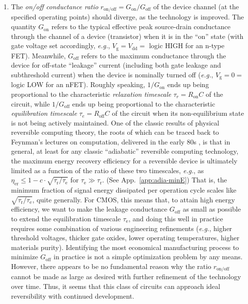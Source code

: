 \documentclass[preprints,article,accept,moreauthors,pdftex]{Definitions/mdpi}
\begin{document}
\begin{paracol}{2}
\begin{enumerate}
    \item The \emph{on/off conductance ratio} $r_{\mathrm{on/off}} = G_{\mathrm{on}}/G_{\mathrm{off}}$ of the device channel (at the specified operating points) should diverge, as the technology is improved. The quantity $G_{\mathrm{on}}$ refers to the typical effective peak source-drain conductance through the channel of a device (transistor) when it is in the ``on'' state (with gate voltage set accordingly, \emph{e.g.}, $V_\mathrm{g} = V_\mathrm{dd} = $ logic HIGH for an n-type FET). Meanwhile, $G_{\mathrm{off}}$ refers to the maximum conductance through the device for off-state ``leakage'' current (including both gate leakage and subthreshold current) when the device is nominally turned off (\emph{e.g.}, $V_\mathrm{g} = 0 = $ logic LOW for an nFET). Roughly speaking, $1/G_\mathrm{on}$ ends up being proportional to the characteristic \emph{relaxation timescale} $\tau_{r} = R_\mathrm{on}C$ of the circuit, while $1/G_\mathrm{off}$ ends up being proportional to the characteristic \emph{equilibration timescale} $\tau_e = R_\mathrm{off}C$ of the circuit when its non-equilibrium state is not being actively maintained. One of the classic results of physical reversible computing theory, the roots of which can be traced back to Feynman's lectures on computation, delivered in the early 80s \cite{Fey00}, is that in general, at least for any classic ``adiabatic'' reversible computing technology, the maximum energy recovery efficiency for a reversible device is ultimately limited as a function of the ratio of these two timescales, \emph{e.g.}, as $\eta_\mathrm{er} \leq 1 - c\cdot\sqrt{\tau_\mathrm{r}/\tau_\mathrm{e}}$ for $\tau_\mathrm{e} \gg \tau_\mathrm{r}$. (See App.~\ref{app:adia-minE}) That is, the minimum fraction of signal energy dissipated per operation cycle scales like $\sqrt{\tau_\mathrm{r}/\tau_\mathrm{e}}$, quite generally. For CMOS, this means that, to attain high energy efficiency, we want to make the leakage conductance $G_\mathrm{off}$ as small as possible to extend the equilibration timescale $\tau_\mathrm{e}$, and doing this well in practice requires some combination of various engineering refinements (\emph{e.g.}, higher threshold voltages, thicker gate oxides, lower operating temperatures, higher materials purity). Identifying the most economical manufacturing process to minimize $G_\mathrm{off}$ in practice is not a simple optimization problem by any means. However, there appears to be no fundamental reason why the ratio $r_\mathrm{on/off}$ cannot be made as large as desired with further refinement of the technology over time. Thus, it seems that this class of circuits can approach ideal reversibility with continued development.
    

\end{enumerate}
\end{paracol}
\end{document}
